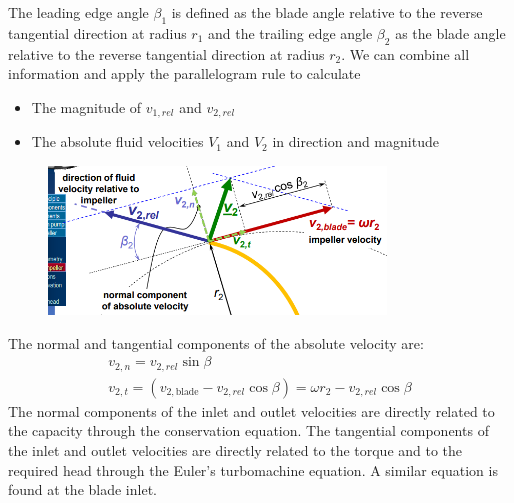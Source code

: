 \documentclass[class=report, crop=false, 12pt,a4paper]{standalone}
\begin{document}
The leading edge angle $\beta_1$ is defined as the blade angle relative to the reverse tangential direction at radius $r_1$ and the trailing edge angle $\beta_2$ as the blade angle relative to the reverse tangential direction at radius $r_2$. We can combine all information and apply the parallelogram rule to calculate
\begin{itemize}
  \item The magnitude of $v_{1, rel}$ and $v_{2, rel}$
  \item The absolute fluid velocities $V_1$ and $V_2$ in direction and magnitude
\end{itemize}
\begin{figure}[H]
  \centering
  \includegraphics[width = 0.8\textwidth]{../img/diagram10.png}
\end{figure}
The normal and tangential components of the absolute velocity are:
\begin{gather}
  v_{2,n} = v_{2,rel} \sin{\beta} \\
  v_{2,t} = (v_{2,\textrm{blade}} - v_{2, rel} \cos{\beta}) = \omega r_2 - v_{2,rel}\cos{\beta}
\end{gather}
The normal components of the inlet and outlet velocities are directly related to the capacity through the conservation equation. The tangential components of the inlet and outlet velocities are directly related to the torque and to the required head through the Euler's turbomachine equation. A similar equation is found at the blade inlet.
\end{document}
